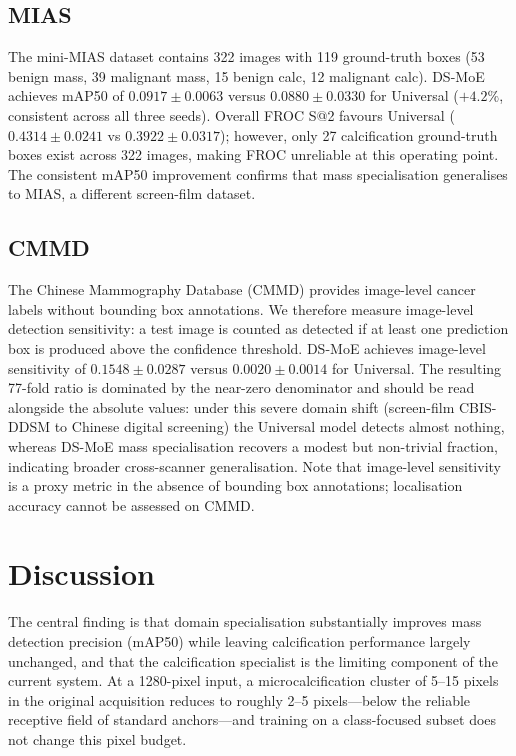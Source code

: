 \documentclass[runningheads]{llncs}
\begin{document}
\subsection{MIAS}

The mini-MIAS dataset \cite{suckling1994mias} contains 322 images with
119 ground-truth boxes (53 benign mass, 39 malignant mass, 15 benign
calc, 12 malignant calc).
DS-MoE achieves mAP50 of $0.0917 \pm 0.0063$ versus $0.0880 \pm 0.0330$
for Universal ($+4.2\%$, consistent across all three seeds). Overall
FROC S@2 favours Universal ($0.4314 \pm 0.0241$ vs $0.3922 \pm 0.0317$);
however, only 27 calcification ground-truth boxes exist across 322
images, making FROC unreliable at this operating point. The consistent
mAP50 improvement confirms that mass specialisation generalises to
MIAS, a different screen-film dataset.

\subsection{CMMD}

The Chinese Mammography Database (CMMD) \cite{cui2021cmmd} provides
image-level cancer labels without bounding box annotations. We therefore measure
image-level detection sensitivity: a test image is counted as detected
if at least one prediction box is produced above the confidence
threshold. DS-MoE achieves image-level sensitivity of
$0.1548 \pm 0.0287$ versus $0.0020 \pm 0.0014$ for Universal. The
resulting 77-fold ratio is dominated by the near-zero denominator and
should be read alongside the absolute values: under this severe domain
shift (screen-film CBIS-DDSM to Chinese digital screening) the Universal
model detects almost nothing, whereas DS-MoE mass specialisation recovers
a modest but non-trivial fraction, indicating broader cross-scanner
generalisation. Note that image-level
sensitivity is a proxy metric in the absence of bounding box annotations;
localisation accuracy cannot be assessed on CMMD.

\section{Discussion}
\label{sec:discussion}

The central finding is that domain specialisation substantially improves
mass detection precision (mAP50) while leaving calcification performance
largely unchanged, and that the calcification specialist is the limiting
component of the current system. At a 1280-pixel input, a microcalcification cluster of 5--15 pixels in
the original acquisition reduces to roughly 2--5 pixels---below the
reliable receptive field of standard anchors---and training on a
class-focused subset does not change this pixel budget.
\end{document}
